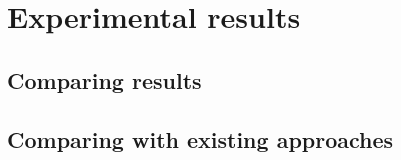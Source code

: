\section{Experimental results}
\subsection{Comparing results}
\subsection{Comparing with existing approaches}
